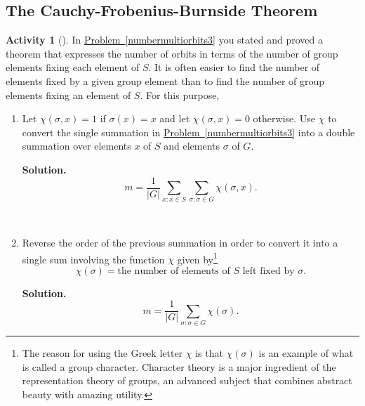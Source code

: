 \documentclass[10pt,]{book}
\theoremstyle{plain}
\theoremstyle{definition}
\newtheorem{activity}[project]{Activity}
\numberwithin{equation}{chapter}
\begin{document}
\subsection[{The Cauchy-Frobenius-Burnside Theorem}]{The Cauchy-Frobenius-Burnside Theorem}\label{subsection-66}
\begin{activity}[]\label{numbermultiorbits4}
In \hyperref[numbermultiorbits3]{Problem~\ref{numbermultiorbits3}} you stated and proved a theorem that expresses the number of orbits in terms of the number of group elements fixing each element of \(S\). It is often easier to find the number of elements fixed by a given group element than to find the number of group elements fixing an element of \(S\). For this purpose,%
~\par
\begin{enumerate}[label=(\alph*)]
 \item Let \(\chi(\sigma,x)=1\) if \(\sigma(x)=x\) and let \(\chi(\sigma,x) =0\) otherwise.  Use \(\chi\) to convert the single summation in \hyperref[numbermultiorbits3]{Problem~\ref{numbermultiorbits3}} into a double summation over elements \(x\) of \(S\) and elements \(\sigma\) of \(G\).%
\par\medskip\noindent%
\textbf{Solution.}\quad %
\begin{equation*}
m=\frac{1}{|G|}\sum_{x:x\in S}\sum_{\sigma:\sigma\in G}
\chi(\sigma,x).
\end{equation*}

~\par
\item Reverse the order of the previous summation in order to convert it into a single sum involving the function \(\chi\) given by\footnote{The reason for using the Greek letter \(\chi\) is that \(\chi(\sigma)\) is an example of what is called a group character.  Character theory is a major ingredient of the representation theory of groups, an advanced subject that combines abstract beauty with amazing utility.\label{fn-23}}%
\begin{equation*}
\chi(\sigma) =
\mbox{the number of elements of \(S\) left fixed by \(\sigma\)} .
\end{equation*}
%
\par\medskip\noindent%
\textbf{Solution.}\quad %
\begin{equation*}
m=\frac{1}{|G|}\sum_{\sigma:\sigma \in G} \chi(\sigma).
\end{equation*}

\end{enumerate}
\end{activity}
\end{document}
